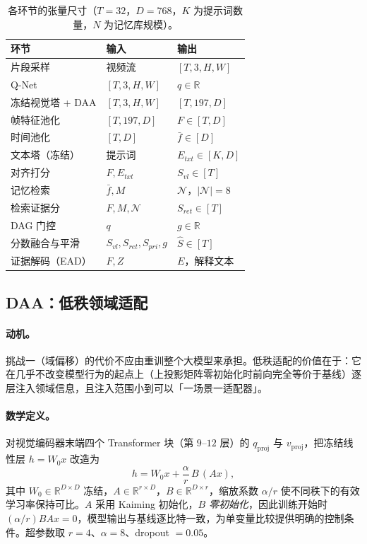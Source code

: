 \begin{table}[t]
\centering
\small
\caption{\evivad{} 各环节的张量尺寸（$T{=}32$，$D{=}768$，$K$ 为提示词数量，$N$ 为记忆库规模）。}
\label{tab:tensor}
\begin{tabular}{lll}
\toprule
环节 & 输入 & 输出 \\
\midrule
片段采样 & 视频流 & $[T,3,H,W]$ \\
Q-Net & $[T,3,H,W]$ & $q \in \mathbb{R}$ \\
冻结视觉塔 + DAA & $[T,3,H,W]$ & $[T,197,D]$ \\
帧特征池化 & $[T,197,D]$ & $F \in [T,D]$ \\
时间池化 & $[T,D]$ & $\bar{f} \in [D]$ \\
文本塔（冻结） & 提示词 & $E_{txt} \in [K,D]$ \\
对齐打分 & $F, E_{txt}$ & $S_{vl} \in [T]$ \\
记忆检索 & $\bar{f}, M$ & $\mathcal{N}$，$|\mathcal{N}|{=}8$ \\
检索证据分 & $F, M, \mathcal{N}$ & $S_{ret} \in [T]$ \\
DAG 门控 & $q$ & $g \in \mathbb{R}$ \\
分数融合与平滑 & $S_{vl}, S_{ret}, S_{pri}, g$ & $\hat{S} \in [T]$ \\
证据解码（EAD） & $F, Z$ & $E$，解释文本 \\
\bottomrule
\end{tabular}
\end{table}

\subsection{DAA：低秩领域适配}

\paragraph{动机。} 挑战一（域偏移）的代价不应由重训整个大模型来承担。低秩适配的价值在于：它在几乎不改变模型行为的起点上（上投影矩阵零初始化时前向完全等价于基线）逐层注入领域信息，且注入范围小到可以「一场景一适配器」。

\paragraph{数学定义。} 对视觉编码器末端四个 Transformer 块（第 $9$–$12$ 层）的 $q_{\text{proj}}$ 与 $v_{\text{proj}}$，把冻结线性层 $h = W_0 x$ 改造为
\begin{equation}
h = W_0 x + \frac{\alpha}{r}\, B\,(A x),
\end{equation}
其中 $W_0 \in \mathbb{R}^{D \times D}$ 冻结，$A \in \mathbb{R}^{r \times D}$，$B \in \mathbb{R}^{D \times r}$，缩放系数 $\alpha/r$ 使不同秩下的有效学习率保持可比。$A$ 采用 Kaiming 初始化，$B$ \emph{零初始化}，因此训练开始时 $({\alpha}/{r}) B A x = 0$，模型输出与基线逐比特一致，为单变量比较提供明确的控制条件。超参数取 $r{=}4$、$\alpha{=}8$、dropout $=0.05$。

